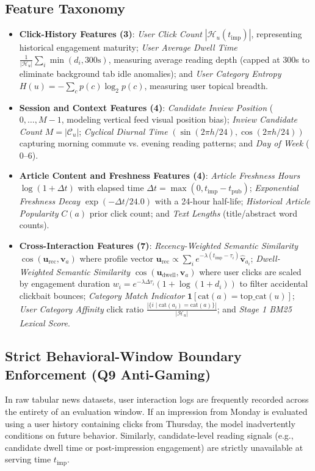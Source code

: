 \documentclass[11pt,a4paper]{article}
\begin{document}
\subsection{Feature Taxonomy}
\begin{itemize}[leftmargin=*,noitemsep,topsep=1pt]
    \item \textbf{Click-History Features (3)}: \textit{User Click Count} $|\mathcal{H}_u(t_{\text{imp}})|$, representing historical engagement maturity; \textit{User Average Dwell Time} $\frac{1}{|\mathcal{H}_u|} \sum_{i} \min(d_i, 300\text{s})$, measuring average reading depth (capped at 300s to eliminate background tab idle anomalies); and \textit{User Category Entropy} $H(u) = -\sum_{c} p(c) \log_2 p(c)$, measuring user topical breadth.
    \item \textbf{Session and Context Features (4)}: \textit{Candidate Inview Position} ($0, \dots, M-1$, modeling vertical feed visual position bias); \textit{Inview Candidate Count} $M = |\mathcal{C}_u|$; \textit{Cyclical Diurnal Time} $(\sin(2\pi h / 24), \cos(2\pi h / 24))$ capturing morning commute vs. evening reading patterns; and \textit{Day of Week} ($0\text{--}6$).
    \item \textbf{Article Content and Freshness Features (4)}: \textit{Article Freshness Hours} $\log(1 + \Delta t)$ with elapsed time $\Delta t = \max(0, t_{\text{imp}} - t_{\text{pub}})$; \textit{Exponential Freshness Decay} $\exp(-\Delta t / 24.0)$ with a 24-hour half-life; \textit{Historical Article Popularity} $C(a)$ prior click count; and \textit{Text Lengths} (title/abstract word counts).
    \item \textbf{Cross-Interaction Features (7)}: \textit{Recency-Weighted Semantic Similarity} $\cos(\mathbf{u}_{\text{rec}}, \mathbf{v}_a)$ where profile vector $\mathbf{u}_{\text{rec}} \propto \sum_{i} e^{-\lambda (t_{\text{imp}} - \tau_i)} \hat{\mathbf{v}}_{a_i}$; \textit{Dwell-Weighted Semantic Similarity} $\cos(\mathbf{u}_{\text{dwell}}, \mathbf{v}_a)$ where user clicks are scaled by engagement duration $w_i = e^{-\lambda \Delta \tau_i}(1 + \log(1 + d_i))$ to filter accidental clickbait bounces; \textit{Category Match Indicator} $\mathbf{1}[\text{cat}(a) = \text{top\_cat}(u)]$; \textit{User Category Affinity} click ratio $\frac{|\{i \mid \text{cat}(a_i) = \text{cat}(a)\}|}{|\mathcal{H}_u|}$; and \textit{Stage 1 BM25 Lexical Score}.
\end{itemize}

\subsection{Strict Behavioral-Window Boundary Enforcement (Q9 Anti-Gaming)}
In raw tabular news datasets, user interaction logs are frequently recorded across the entirety of an evaluation window. If an impression from Monday is evaluated using a user history containing clicks from Thursday, the model inadvertently conditions on future behavior. Similarly, candidate-level reading signals (e.g., candidate dwell time or post-impression engagement) are strictly unavailable at serving time $t_{\text{imp}}$.
\end{document}
